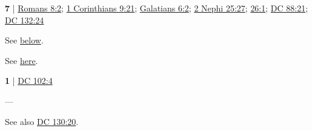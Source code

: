 	\begin{compactdesc}
	
		\item[law of Christ] \textbf{7} | \hyperref[ROMANS-8-2]{Romans 8:2}; \hyperref[1CORINTHIANS-9-21]{1 Corinthians 9:21}; \hyperref[GALATIANS-6-2]{Galatians 6:2}; \hyperref[2NEPHI-25-27]{2 Nephi 25:27}; \hyperref[2NEPHI-26-1]{26:1}; \hyperref[DC88-21]{DC 88:21}; \hyperref[DC132-24]{DC 132:24} %
			\begin{compactdesc}
				\item[Bible anchor verses] \phantom{.}
					\begin{compactdesc}
						\item[Galatians 6:2] 
					\end{compactdesc}
				\item[Commentary] See \hyperref[LAW-christ]{below}.
			\end{compactdesc}
			
		\item[law of death]
			
		\item[law of faith]
			\begin{compactdesc}
				\item[Bible anchor verses] \phantom{.}
					\begin{compactdesc}
						\item[Romans 3:27] 
					\end{compactdesc}
			\end{compactdesc}
			
		\item[law of the gospel] See \hyperref[GOSPEL-PHRASES]{here}.
		
		\item[law of heaven] \textbf{1} | \hyperref[DC102-4]{DC 102:4}
			\begin{compactdesc}
				\item[Bible anchor verses] ---
				\item[Commentary] See also \hyperref[DC130-20]{DC 130:20}.
			\end{compactdesc}
			
		\item[law of sin]
		

\end{compactdesc}
